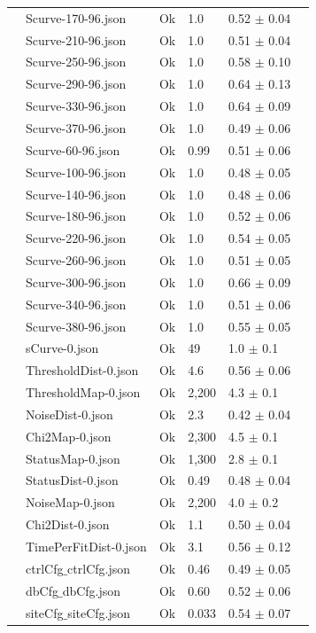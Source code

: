 {\begin{longtable}{|llllll|}
 & Scurve-170-96.json & Ok & 1.0 & 0.52 $\pm$ 0.04 & \\
 & Scurve-210-96.json & Ok & 1.0 & 0.51 $\pm$ 0.04 & \\
 & Scurve-250-96.json & Ok & 1.0 & 0.58 $\pm$ 0.10 & \\
 & Scurve-290-96.json & Ok & 1.0 & 0.64 $\pm$ 0.13 & \\
 & Scurve-330-96.json & Ok & 1.0 & 0.64 $\pm$ 0.09 & \\
 & Scurve-370-96.json & Ok & 1.0 & 0.49 $\pm$ 0.06 & \\
 & Scurve-60-96.json & Ok & 0.99 & 0.51 $\pm$ 0.06 & \\
 & Scurve-100-96.json & Ok & 1.0 & 0.48 $\pm$ 0.05 & \\
 & Scurve-140-96.json & Ok & 1.0 & 0.48 $\pm$ 0.06 & \\
 & Scurve-180-96.json & Ok & 1.0 & 0.52 $\pm$ 0.06 & \\
 & Scurve-220-96.json & Ok & 1.0 & 0.54 $\pm$ 0.05 & \\
 & Scurve-260-96.json & Ok & 1.0 & 0.51 $\pm$ 0.05 & \\
 & Scurve-300-96.json & Ok & 1.0 & 0.66 $\pm$ 0.09 & \\
 & Scurve-340-96.json & Ok & 1.0 & 0.51 $\pm$ 0.06 & \\
 & Scurve-380-96.json & Ok & 1.0 & 0.55 $\pm$ 0.05 & \\
 & sCurve-0.json & Ok & 49 & 1.0 $\pm$ 0.1 & \\
 & ThresholdDist-0.json & Ok & 4.6 & 0.56 $\pm$ 0.06 & \\
 & ThresholdMap-0.json & Ok & 2,200 & 4.3 $\pm$ 0.1 & \\
 & NoiseDist-0.json & Ok & 2.3 & 0.42 $\pm$ 0.04 & \\
 & Chi2Map-0.json & Ok & 2,300 & 4.5 $\pm$ 0.1 & \\
 & StatusMap-0.json & Ok & 1,300 & 2.8 $\pm$ 0.1 & \\
 & StatusDist-0.json & Ok & 0.49 & 0.48 $\pm$ 0.04 & \\
 & NoiseMap-0.json & Ok & 2,200 & 4.0 $\pm$ 0.2 & \\
 & Chi2Dist-0.json & Ok & 1.1 & 0.50 $\pm$ 0.04 & \\
 & TimePerFitDist-0.json & Ok & 3.1 & 0.56 $\pm$ 0.12 & \\
 & ctrlCfg$\_$ctrlCfg.json & Ok & 0.46 & 0.49 $\pm$ 0.05 & \\
 & dbCfg$\_$dbCfg.json & Ok & 0.60 & 0.52 $\pm$ 0.06 & \\
 & siteCfg$\_$siteCfg.json & Ok & 0.033 & 0.54 $\pm$ 0.07 & \\

\end{longtable}}
